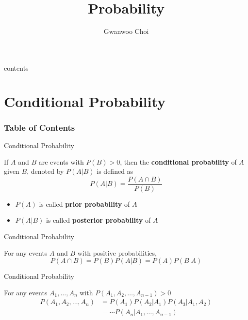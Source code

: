 \documentclass{beamer}
\title{Probability}
\author{Gwanwoo Choi}
\newcommand{\tb}[1]{\textbf{#1}}
\begin{document}
\begin{frame}
    \titlepage
\end{frame}

\begin{frame}{contents}
    \tableofcontents
\end{frame}

\section{Conditional Probability}

\begin{frame}
    \frametitle{Table of Contents}
    \tableofcontents[currentsection]
\end{frame}

\begin{frame}{Conditional Probability}
    \begin{definition}
        If $A$ and $B$ are events with $P(B) > 0$, then the \tb{conditional probability} of $A$ given $B$, denoted by $P(A|B)$ is defined as $$P(A|B) = \frac{P(A \cap B)}{P(B)}$$
    \end{definition}
    \begin{itemize}
        \item $P(A)$ is called \tb{prior probability} of $A$
        \item $P(A|B)$ is called \tb{posterior probability} of $A$
    \end{itemize}
\end{frame}

\begin{frame}{Conditional Probability}
    \begin{theorem}
        For any events $A$ and $B$ with positive probabilities,
        $$P(A \cap B) = P(B)P(A|B) = P(A)P(B|A)$$
    \end{theorem}
\end{frame}

\begin{frame}{Conditional Probability}    
    \begin{theorem}
        For any events $A_1,\dots,A_n$ with $P(A_1,A_2,\dots,A_{n-1}) > 0$
        \[
            \begin{aligned}
                P(A_1,A_2,\dots,A_n) &= P(A_1)P(A_2|A_1)P(A_3|A_1,A_2)\\
                &=\cdots P(A_n|A_1,\dots,A_{n-1})
            \end{aligned}
        \]
    \end{theorem}
\end{frame}
\end{document}
